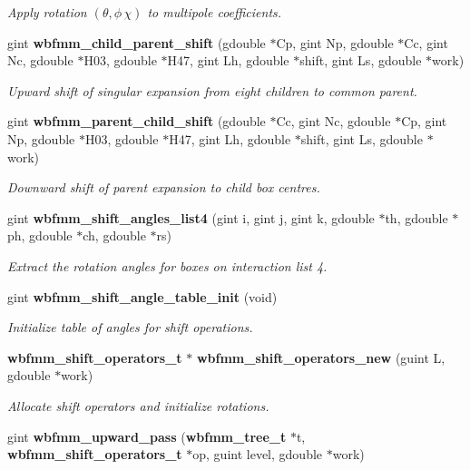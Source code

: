 \begin{DoxyCompactItemize}
\begin{DoxyCompactList}\small\item\em Apply rotation $(\theta,\phi\,\chi)$ to multipole coefficients. \end{DoxyCompactList}\item 
gint {\bf wbfmm\+\_\+child\+\_\+parent\+\_\+shift} (gdouble $\ast$Cp, gint Np, gdouble $\ast$Cc, gint Nc, gdouble $\ast$H03, gdouble $\ast$H47, gint Lh, gdouble $\ast$shift, gint Ls, gdouble $\ast$work)
\begin{DoxyCompactList}\small\item\em Upward shift of singular expansion from eight children to common parent. \end{DoxyCompactList}\item 
gint {\bf wbfmm\+\_\+parent\+\_\+child\+\_\+shift} (gdouble $\ast$Cc, gint Nc, gdouble $\ast$Cp, gint Np, gdouble $\ast$H03, gdouble $\ast$H47, gint Lh, gdouble $\ast$shift, gint Ls, gdouble $\ast$work)
\begin{DoxyCompactList}\small\item\em Downward shift of parent expansion to child box centres. \end{DoxyCompactList}\item 
gint {\bf wbfmm\+\_\+shift\+\_\+angles\+\_\+list4} (gint i, gint j, gint k, gdouble $\ast$th, gdouble $\ast$ph, gdouble $\ast$ch, gdouble $\ast$rs)
\begin{DoxyCompactList}\small\item\em Extract the rotation angles for boxes on interaction list 4. \end{DoxyCompactList}\item 
gint {\bf wbfmm\+\_\+shift\+\_\+angle\+\_\+table\+\_\+init} (void)
\begin{DoxyCompactList}\small\item\em Initialize table of angles for shift operations. \end{DoxyCompactList}\item 
{\bf wbfmm\+\_\+shift\+\_\+operators\+\_\+t} $\ast$ {\bf wbfmm\+\_\+shift\+\_\+operators\+\_\+new} (guint L, gdouble $\ast$work)
\begin{DoxyCompactList}\small\item\em Allocate shift operators and initialize rotations. \end{DoxyCompactList}\item 
gint {\bf wbfmm\+\_\+upward\+\_\+pass} ({\bf wbfmm\+\_\+tree\+\_\+t} $\ast$t, {\bf wbfmm\+\_\+shift\+\_\+operators\+\_\+t} $\ast$op, guint level, gdouble $\ast$work)

\end{DoxyCompactItemize}
